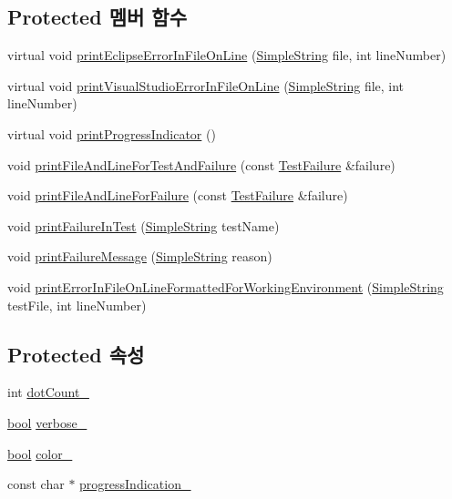 \subsection*{Protected 멤버 함수}
\begin{DoxyCompactItemize}
\item 
virtual void \hyperlink{class_test_output_aa2b6f28b76a53cac4059991bc3c86f79}{print\+Eclipse\+Error\+In\+File\+On\+Line} (\hyperlink{class_simple_string}{Simple\+String} file, int line\+Number)
\item 
virtual void \hyperlink{class_test_output_a0a0136e850e6b9a696ab84e5c416341a}{print\+Visual\+Studio\+Error\+In\+File\+On\+Line} (\hyperlink{class_simple_string}{Simple\+String} file, int line\+Number)
\item 
virtual void \hyperlink{class_test_output_a0cd44d3b6da1caa7b8d335ef7580a391}{print\+Progress\+Indicator} ()
\item 
void \hyperlink{class_test_output_ae20c439e68036cc705a86d9a95954168}{print\+File\+And\+Line\+For\+Test\+And\+Failure} (const \hyperlink{class_test_failure}{Test\+Failure} \&failure)
\item 
void \hyperlink{class_test_output_a1d78706f5181a464f5fafb178d231be9}{print\+File\+And\+Line\+For\+Failure} (const \hyperlink{class_test_failure}{Test\+Failure} \&failure)
\item 
void \hyperlink{class_test_output_a1748d410d65b95596df95234742258a3}{print\+Failure\+In\+Test} (\hyperlink{class_simple_string}{Simple\+String} test\+Name)
\item 
void \hyperlink{class_test_output_ab13cdfa930cc1ad29b36b1ab7ff77a99}{print\+Failure\+Message} (\hyperlink{class_simple_string}{Simple\+String} reason)
\item 
void \hyperlink{class_test_output_a56ae5964123fc91c7149a8274aa22db9}{print\+Error\+In\+File\+On\+Line\+Formatted\+For\+Working\+Environment} (\hyperlink{class_simple_string}{Simple\+String} test\+File, int line\+Number)
\end{DoxyCompactItemize}
\subsection*{Protected 속성}
\begin{DoxyCompactItemize}
\item 
int \hyperlink{class_test_output_a3c1c7e8cf0310d384198f0dc504251c6}{dot\+Count\+\_\+}
\item 
\hyperlink{avb__gptp_8h_af6a258d8f3ee5206d682d799316314b1}{bool} \hyperlink{class_test_output_a86126da532c138842a42d8e9a52b0806}{verbose\+\_\+}
\item 
\hyperlink{avb__gptp_8h_af6a258d8f3ee5206d682d799316314b1}{bool} \hyperlink{class_test_output_adda8c1875964c3b80ed1c77b585fc756}{color\+\_\+}
\item 
const char $\ast$ \hyperlink{class_test_output_a4cbc8ea3886624399ab3879767d4f018}{progress\+Indication\+\_\+}
\end{DoxyCompactItemize}
